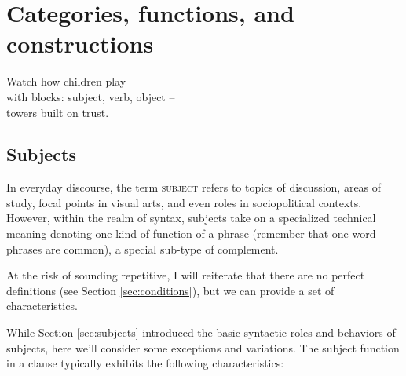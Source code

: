 \chapter{Categories, functions, and constructions}


\epigraph{Watch how children play\\
with blocks: subject, verb, object --\\
towers built on trust.}{}

\section{Subjects} \label{sec:subjects2}
In everyday discourse, the term \textsc{subject} refers to topics of discussion, areas of study, focal points in visual arts, and even roles in sociopolitical contexts. However, within the realm of syntax, subjects take on a specialized technical meaning denoting one kind of function of a phrase (remember that one-word phrases are common), a special sub-type of complement.

At the risk of sounding repetitive, I will reiterate that there are no perfect definitions (see Section \ref{sec:conditions}), but we can provide a set of characteristics.

While Section \ref{sec:subjects} introduced the basic syntactic roles and behaviors of subjects, here we'll consider some exceptions and variations. The subject function in a clause typically exhibits the following characteristics:

